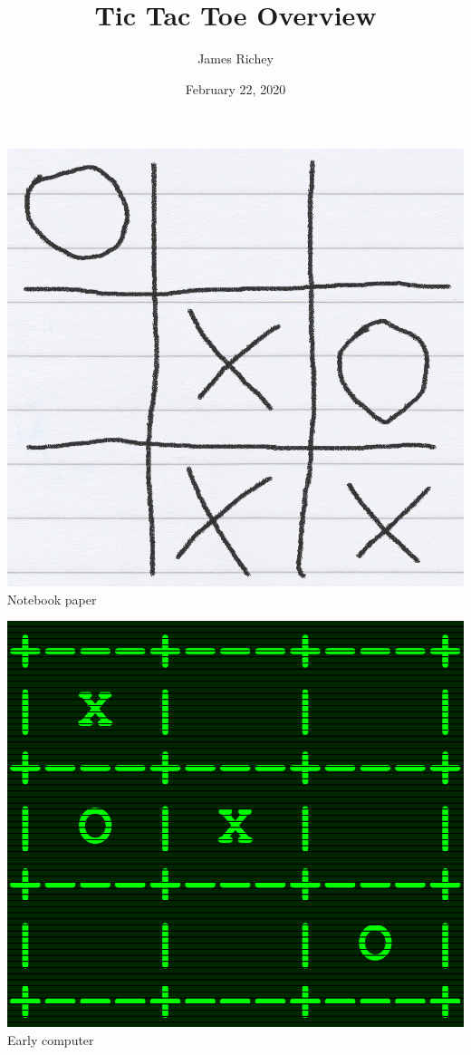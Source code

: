 \documentclass{tufte-handout}
\title{Tic Tac Toe Overview}
\author{James Richey}
\date{February 22, 2020}
\begin{document}
\maketitle


\begin{marginfigure}
  \includegraphics[width=\linewidth]{img/concept-art/paper}
  Notebook paper
\end{marginfigure}

\begin{marginfigure}
  \includegraphics[width=\linewidth]{img/concept-art/computer}
  Early computer
\end{marginfigure}
\end{document}
